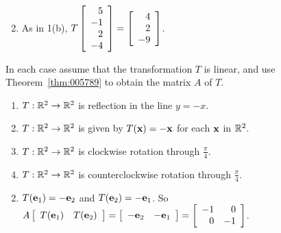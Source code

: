 \begin{multicols}{2}
\begin{ex}
{\begin{enumerate}[label={\alph*.}]
\end{enumerate}}
\begin{sol}
\begin{enumerate}[label={\alph*.}]
\setcounter{enumi}{1}
\item  As in 1(b), $T \left[ \begin{array}{r}
5 \\
-1 \\
2 \\
-4
\end{array} \right] = \left[ \begin{array}{r}
4 \\
2 \\
-9
\end{array} \right]$.

\end{enumerate}
\end{sol}
\end{ex}

\begin{ex}
In each case assume that the transformation $T$ is linear, and use Theorem~\ref{thm:005789} to obtain the matrix $A$ of $T$.

\begin{enumerate}[leftmargin=1em,label={\alph*.}]
\item $T : \mathbb{R}^2 \to \mathbb{R}^2$ is reflection in the line $y = -x$.

\item $T : \mathbb{R}^2 \to \mathbb{R}^2$ is given by $T(\textbf{x}) = -\textbf{x}$ for each $\textbf{x}$ in $\mathbb{R}^2$.

\item $T : \mathbb{R}^2 \to \mathbb{R}^2$ is clockwise rotation through $\frac{\pi}{4}$.

\item $T : \mathbb{R}^2 \to \mathbb{R}^2$ is counterclockwise rotation through $\frac{\pi}{4}$.

\end{enumerate}
\begin{sol}
\begin{enumerate}[label={\alph*.}]
\setcounter{enumi}{1}
\item $T(\textbf{e}_{1}) = -\textbf{e}_{2}$ and $T(\textbf{e}_{2}) = -\textbf{e}_{1}$. So $A\left[ \begin{array}{cc}
T(\textbf{e}_{1}) & T(\textbf{e}_{2})
\end{array} \right] = \left[ \begin{array}{cc}
-\textbf{e}_{2} & -\textbf{e}_{1}
\end{array} \right] = \left[ \begin{array}{rr}
-1 & 0 \\
0 & -1
\end{array} \right]$.


\end{enumerate}
\end{sol}
\end{ex}
\end{multicols}
